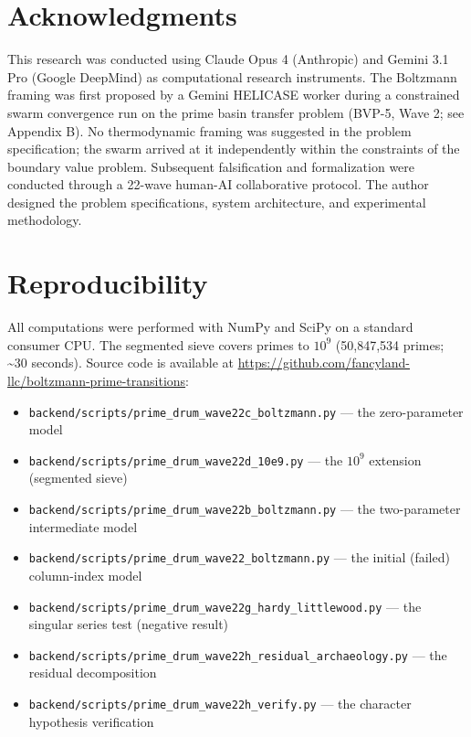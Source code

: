 \documentclass[
  11pt,
]{article}
\providecommand{\tightlist}{%
  \setlength{\itemsep}{0pt}\setlength{\parskip}{0pt}}
\begin{document}
\section*{Acknowledgments}

This research was conducted using Claude Opus 4 (Anthropic) and Gemini
3.1 Pro (Google DeepMind) as computational research instruments. The
Boltzmann framing was first proposed by a Gemini HELICASE worker during
a constrained swarm convergence run on the prime basin transfer problem
(BVP-5, Wave 2; see Appendix B). No thermodynamic framing was suggested
in the problem specification; the swarm arrived at it independently
within the constraints of the boundary value problem. Subsequent
falsification and formalization were conducted through a 22-wave
human-AI collaborative protocol. The author designed the problem
specifications, system architecture, and experimental methodology.

\appendix

\section{Reproducibility}\label{app:reproducibility}

All computations were performed with NumPy and SciPy on a standard
consumer CPU. The segmented sieve covers primes to \(10^9\) (50,847,534
primes; \textasciitilde30 seconds). Source code is available at
\url{https://github.com/fancyland-llc/boltzmann-prime-transitions}:

\begin{itemize}
\tightlist
\item
  \texttt{backend/scripts/prime\_drum\_wave22c\_boltzmann.py} --- the
  zero-parameter model
\item
  \texttt{backend/scripts/prime\_drum\_wave22d\_10e9.py} --- the
  \(10^9\) extension (segmented sieve)
\item
  \texttt{backend/scripts/prime\_drum\_wave22b\_boltzmann.py} --- the
  two-parameter intermediate model
\item
  \texttt{backend/scripts/prime\_drum\_wave22\_boltzmann.py} --- the
  initial (failed) column-index model
\item
  \texttt{backend/scripts/prime\_drum\_wave22g\_hardy\_littlewood.py}
  --- the singular series test (negative result)
\item
  \texttt{backend/scripts/prime\_drum\_wave22h\_residual\_archaeology.py}
  --- the residual decomposition
\item
  \texttt{backend/scripts/prime\_drum\_wave22h\_verify.py} --- the
  character hypothesis verification
\end{itemize}
\end{document}
